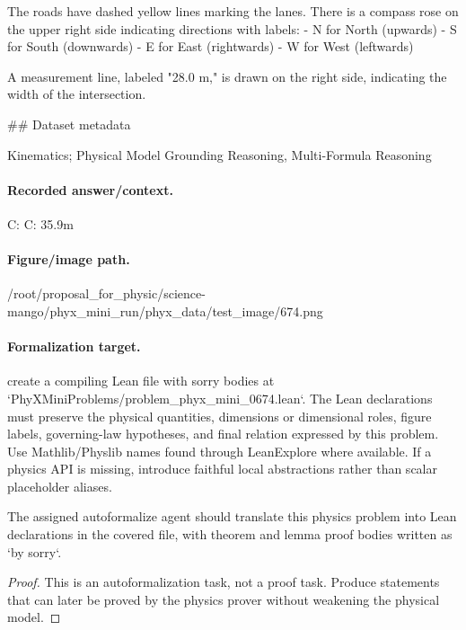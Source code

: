 The roads have dashed yellow lines marking the lanes. There is a compass rose on the upper right side indicating directions with labels:
- N for North (upwards)
- S for South (downwards)
- E for East (rightwards)
- W for West (leftwards)

A measurement line, labeled "28.0 m," is drawn on the right side, indicating the width of the intersection.

\#\# Dataset metadata

Kinematics; Physical Model Grounding Reasoning, Multi-Formula Reasoning

\paragraph{Recorded answer/context.}
C: C: 35.9m

\paragraph{Figure/image path.}
/root/proposal\_for\_physic/science-mango/phyx\_mini\_run/phyx\_data/test\_image/674.png

\paragraph{Formalization target.}
create a compiling Lean file with sorry bodies at `PhyXMiniProblems/problem\_phyx\_mini\_0674.lean`. The Lean declarations must preserve the physical quantities, dimensions or dimensional roles, figure labels, governing-law hypotheses, and final relation expressed by this problem.
Use Mathlib/Physlib names found through LeanExplore where available. If a physics API is missing, introduce faithful local abstractions rather than scalar placeholder aliases.

\begin{theorem}
\label{thm:physics:phyx_mini_0674:target}
The assigned autoformalize agent should translate this physics problem into Lean declarations in the covered file, with theorem and lemma proof bodies written as `by sorry`.
\end{theorem}
\begin{proof}
This is an autoformalization task, not a proof task. Produce statements that can later be proved by the physics prover without weakening the physical model.
\end{proof}

